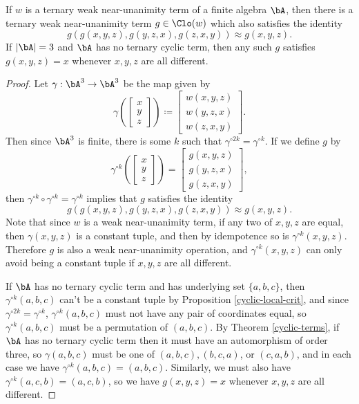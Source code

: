 \begin{thm}\label{ternary-iteration} If $w$ is a ternary weak near-unanimity term of a finite algebra $\bA$, then there is a ternary weak near-unanimity term $g \in \Clo(w)$ which also satisfies the identity
\[
g(g(x,y,z),g(y,z,x),g(z,x,y)) \approx g(x,y,z).
\]
If $|\bA| = 3$ and $\bA$ has no ternary cyclic term, then any such $g$ satisfies $g(x,y,z) = x$ whenever $x,y,z$ are all different.
\end{thm}
\begin{proof} Let $\gamma : \bA^3 \rightarrow \bA^3$ be the map given by
\[
\gamma\left(\begin{bmatrix}x\\ y\\ z\end{bmatrix}\right) \coloneqq \begin{bmatrix}w(x,y,z)\\ w(y,z,x)\\ w(z,x,y)\end{bmatrix}.
\]
Then since $\bA^3$ is finite, there is some $k$ such that $\gamma^{\circ 2k} = \gamma^{\circ k}$. If we define $g$ by
\[
\gamma^{\circ k}\left(\begin{bmatrix}x\\ y\\ z\end{bmatrix}\right) = \begin{bmatrix}g(x,y,z)\\ g(y,z,x)\\ g(z,x,y)\end{bmatrix},
\]
then $\gamma^{\circ k} \circ \gamma^{\circ k} = \gamma^{\circ k}$ implies that $g$ satisfies the identity
\[
g(g(x,y,z),g(y,z,x),g(z,x,y)) \approx g(x,y,z).
\]
Note that since $w$ is a weak near-unanimity term, if any two of $x,y,z$ are equal, then $\gamma(x,y,z)$ is a constant tuple, and then by idempotence so is $\gamma^{\circ k}(x,y,z)$. Therefore $g$ is also a weak near-unanimity operation, and $\gamma^{\circ k}(x,y,z)$ can only avoid being a constant tuple if $x,y,z$ are all different.

If $\bA$ has no ternary cyclic term and has underlying set $\{a,b,c\}$, then $\gamma^{\circ k}(a,b,c)$ can't be a constant tuple by Proposition \ref{cyclic-local-crit}, and since $\gamma^{\circ 2k} = \gamma^{\circ k}$, $\gamma^{\circ k}(a,b,c)$ must not have any pair of coordinates equal, so $\gamma^{\circ k}(a,b,c)$ must be a permutation of $(a,b,c)$. By Theorem \ref{cyclic-terms}, if $\bA$ has no ternary cyclic term then it must have an automorphism of order three, so $\gamma(a,b,c)$ must be one of $(a,b,c), (b,c,a)$, or $(c,a,b)$, and in each case we have $\gamma^{\circ k}(a,b,c) = (a,b,c)$. Similarly, we must also have $\gamma^{\circ k}(a,c,b) = (a,c,b)$, so we have $g(x,y,z) = x$ whenever $x,y,z$ are all different.
\end{proof}

